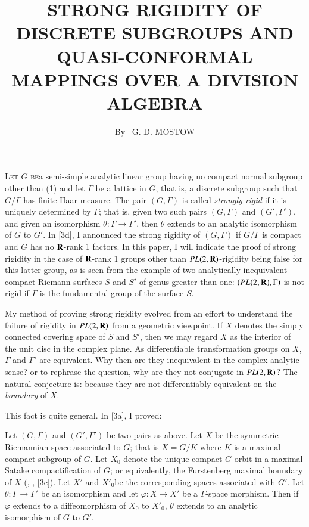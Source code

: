 
\title{STRONG RIGIDITY OF DISCRETE SUBGROUPS AND QUASI-CONFORMAL MAPPINGS OVER A DIVISION ALGEBRA}

\author{By~ G. D. MOSTOW}

\date{}
\maketitle


\setcounter{page}{216}
\setcounter{pageoriginal}{202}

\textsc{Let $G$ be}\pageoriginale a semi-simple analytic linear group having no compact normal subgroup other than (1) and let $\Gamma$ be a lattice in $G$, that is, a discrete subgroup such that $G/\Gamma$ has finite Haar measure. The pair $(G, \Gamma)$ is called \textit{strongly rigid} if it is uniquely determined by $\Gamma$; that is, given two such pairs $(G, \Gamma)$  and $(G',\Gamma')$, and given an isomorphism $\theta: \Gamma \to \Gamma'$, then $\theta$ extends to an analytic isomorphism of $G$ to $G'$. In [3d], I announced the strong rigidity of $(G,\Gamma)$ if $G/\Gamma$ is compact and $G$ has no $\mathbf{R}$-rank 1 factors. In this paper, I will indicate the proof of strong rigidity in the case of $\mathbf{R}$-rank 1 groups other than $PL (2, \mathbf{R})$-rigidity being false for this latter group, as is seen from the example of two analytically inequivalent compact Riemann surfaces $S$ and $S'$ of genus greater than one: $(PL (2, \mathbf{R}), \Gamma)$ is not rigid if $\Gamma$ is the fundamental group of the surface $S$.

My method of proving strong rigidity evolved from an effort to understand the failure of rigidity in $PL(2, \mathbf{R})$ from a geometric viewpoint. If $X$ denotes the simply connected covering space of $S$ and $S'$, then we may regard $X$ as the interior of the unit disc in the complex plane. As differentiable transformation groups on $X$, $\Gamma$ and $\Gamma'$ are equivalent. Why then are they inequivalent in the complex analytic sense? or to rephrase the question, why are they not conjugate in $PL (2,\mathbf{R})$? The natural conjecture is: because they are not differentiably equivalent on the \textit{boundary} of $X$.

This fact is quite general. In [3a], I proved:

Let $(G,\Gamma)$ and $(G', \Gamma')$ be two pairs as above. Let $X$ be the symmetric Riemannian space associated to $G$; that is $X = G/ K$ where $K$ is a maximal compact subgroup of $G$. Let $X_0$ denote the unique compact $G$-orbit in a maximal Satake compactification of $G$; or equivalently, the Furstenberg maximal boundary of $X$ (\cf \cite{art7-key1}, \cite{art7-key5}, [3c]). Let $X'$ and $X'_0$\pageoriginale be the corresponding spaces associated with $G'$. Let $\theta: \Gamma \to \Gamma'$ be an isomorphism and let $\varphi: X \to X'$ be a $\Gamma$-space morphism. Then if $\varphi$ extends to a diffeomorphism of $X_0$ to $X'_0$, $\theta$ extends to an analytic isomorphism of $G$ to $G'$.

